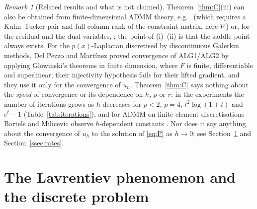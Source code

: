 \documentclass[11pt]{amsart}
\theoremstyle{definition}
\theoremstyle{remark}
\newtheorem{remark}[theorem]{Remark}
\numberwithin{equation}{section}
\begin{document}
\begin{remark}[Related results and what is not claimed]\label{rem:C-literature}
Theorem~\ref{thm:C}(iii) can also be obtained from finite-dimensional ADMM theory, e.g.\ \cite[Thm.~8]{EcksteinBertsekas1992} (which requires a Kuhn--Tucker pair and full column rank of the constraint matrix, here $\nabla$) or, for the residual and the dual variables, \cite[\S3.2]{Boyd2011ADMM}; the point of (i)--(ii) is that the saddle point always exists. For the $p(x)$-Laplacian discretised by discontinuous Galerkin methods, Del Pezzo and Mart\'inez \cite{DelPezzoMartinez2014DCM} proved convergence of ALG1/ALG2 by applying Glowinski's theorems in finite dimension, where $F$ is finite, differentiable and superlinear; their injectivity hypothesis fails for their lifted gradient, and they use it only for the convergence of $u_n$. Theorem~\ref{thm:C} says nothing about the \emph{speed} of convergence or its dependence on $h$, $p$ or $r$: in the experiments the number of iterations grows as $h$ decreases for $p<2$, $p=4$, $t^2\log(1+t)$ and $e^t-1$ (Table~\ref{tab:iterations}), and for ADMM on finite element discretisations Bartels and Milicevic observe $h$-dependent constants \cite{BartelsMilicevic2017}. Nor does it say anything about the convergence of $u_h$ to the solution of \eqref{eq:P} as $h\to0$; see Section~\ref{sec:lavrentiev} and Section~\ref{ssec:rates}.
\end{remark}

\section{The Lavrentiev phenomenon and the discrete problem}\label{sec:lavrentiev}
\end{document}
